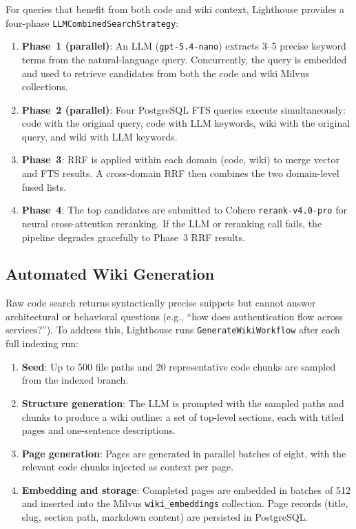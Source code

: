 \documentclass[a4paper,12pt]{article}
\begin{document}
For queries that benefit from both code and wiki context, Lighthouse provides
a four-phase \texttt{LLMCombinedSearchStrategy}:

\begin{enumerate}[noitemsep]
  \item \textbf{Phase~1 (parallel)}: An LLM (\texttt{gpt-5.4-nano}) extracts 3--5 precise keyword terms from the natural-language
    query.
    Concurrently, the query is embedded and used to retrieve candidates from
    both the code and wiki Milvus collections.
  \item \textbf{Phase~2 (parallel)}: Four PostgreSQL FTS queries execute
    simultaneously: code with the original query, code with LLM keywords,
    wiki with the original query, and wiki with LLM keywords.
  \item \textbf{Phase~3}: RRF is applied within each domain (code, wiki) to
    merge vector and FTS results.
    A cross-domain RRF then combines the two domain-level fused lists.
  \item \textbf{Phase~4}: The top candidates are submitted to Cohere
    \texttt{rerank-v4.0-pro} for neural cross-attention reranking.
    If the LLM or reranking call fails, the pipeline degrades gracefully to
    Phase~3 RRF results.
\end{enumerate}

\subsection{Automated Wiki Generation}
\label{sec:wiki}

Raw code search returns syntactically precise snippets but cannot answer
architectural or behavioral questions (e.g., ``how does authentication
flow across services?'').
To address this, Lighthouse runs \texttt{GenerateWikiWorkflow} after each
full indexing run:

\begin{enumerate}[noitemsep]
  \item \textbf{Seed}: Up to 500 file paths and 20 representative code
    chunks are sampled from the indexed branch.
  \item \textbf{Structure generation}: The LLM is prompted with the sampled
    paths and chunks to produce a wiki outline: a set of top-level sections,
    each with titled pages and one-sentence descriptions.
  \item \textbf{Page generation}: Pages are generated in parallel batches of
    eight, with the relevant code chunks injected as context per page.
  \item \textbf{Embedding and storage}: Completed pages are embedded in
    batches of 512 and inserted into the Milvus \texttt{wiki\_embeddings}
    collection.
    Page records (title, slug, section path, markdown content) are persisted
    in PostgreSQL.
\end{enumerate}
\end{document}
